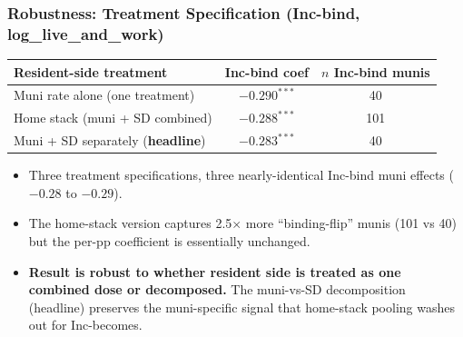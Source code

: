 \documentclass[xcolor = x11names, compress, aspectratio = 169]{beamer}
\begin{document}
    \begin{frame}
    \frametitle{Robustness: Treatment Specification (Inc-bind, log\_live\_and\_work)}
        \centering
        \footnotesize
        \renewcommand{\arraystretch}{1.20}
        \setlength{\tabcolsep}{8pt}
        \begin{tabular}{lcc}
            \toprule
            Resident-side treatment & Inc-bind coef & $n$ Inc-bind munis \\
            \midrule
            Muni rate alone (one treatment)    & $-0.290^{***}$ & 40 \\
            Home stack (muni + SD combined)    & $-0.288^{***}$ & 101 \\
            Muni + SD separately (\textbf{headline}) & $\bm{-0.283^{***}}$ & 40 \\
            \bottomrule
        \end{tabular}
        \medskip

        \footnotesize
        \begin{itemize}\setlength{\itemsep}{0.04cm}
            \item Three treatment specifications, three nearly-identical
            Inc-bind muni effects ($-0.28$ to $-0.29$).
            \item The home-stack version captures 2.5$\times$ more
            ``binding-flip'' munis (101 vs 40) but the per-pp coefficient
            is essentially unchanged.
            \item \textbf{Result is robust to whether resident side is
            treated as one combined dose or decomposed.} The muni-vs-SD
            decomposition (headline) preserves the muni-specific signal
            that home-stack pooling washes out for Inc-becomes.
        \end{itemize}
    \end{frame}
\end{document}
